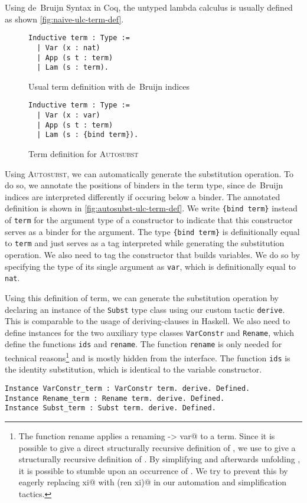 \documentclass{scrartcl}
\newcommand{\Autosubst}{\textsc{Autosubst}\xspace}
\newcommand{\lst}{\lstinline}
\begin{document}
Using de~Bruijn Syntax in Coq, the untyped lambda calculus is usually defined as shown \autoref{fig:naive-ulc-term-def}.
\begin{figure}
\begin{minipage}{0.45\textwidth}
  \centering
\begin{lstlisting}
Inductive term : Type :=
  | Var (x : nat)
  | App (s t : term)
  | Lam (s : term).
\end{lstlisting}
  \caption{Usual term definition with de~Bruijn indices}
  \label{fig:naive-ulc-term-def}
\end{minipage}
\hfill
\begin{minipage}{0.45\textwidth} 
  \begin{lstlisting}
Inductive term : Type :=
  | Var (x : var)
  | App (s t : term)
  | Lam (s : {bind term}). 
\end{lstlisting}
\caption{Term definition for \Autosubst}
\label{fig:autosubst-ulc-term-def}
\end{minipage}
\end{figure}
Using \Autosubst, we can automatically generate the substitution operation.
To do so, we annotate the positions of binders in the term type, since de~Bruijn indices are interpreted differently if occuring below a binder. The annotated definition is shown in \autoref{fig:autosubst-ulc-term-def}.
We write \lst${bind term}$ instead of \lst$term$ for the argument type of a constructor to indicate that this constructor serves as a binder for the argument. 
The type \lst${bind term}$ is definitionally equal to \lst$term$ and just serves as a tag interpreted while generating the substitution operation.
We also need to tag the constructor that builds variables. We do so by specifying the type of its single argument as \lst$var$, which is definitionally equal to \lst$nat$.

Using this definition of term, we can generate the substitution operation \lst@subst@ by declaring an instance of the \lst$Subst$ type class using our custom tactic \lst$derive$. This is comparable to the usage of deriving-clauses in Haskell.
We also need to define instances for the two auxiliary type classes \lst$VarConstr$ and \lst$Rename$, which define the functions \lst$ids$ and \lst$rename$. 
The function \lst$rename$ is only needed for technical reasons\footnote{The function rename applies a renaming \lst@var -> var@ to a term. Since it is possible to give a direct structurally recursive definition of \lst@rename@, we use \lst@rename@ to give a structurally recursive definition of \lst@subst@. By simplifying \lst@subst@ and afterwards unfolding \lst@up@, it is possible to stumble upon an occurrence of \lst@rename@. We try to prevent this by eagerly replacing \lst@rename xi@ with \lst@subst (ren xi)@ in our automation and simplification tactics.} and is mostly hidden from the interface.
The function \lst$ids$ is the identity substitution, which is identical to the variable constructor.
\begin{lstlisting}
Instance VarConstr_term : VarConstr term. derive. Defined.
Instance Rename_term : Rename term. derive. Defined.
Instance Subst_term : Subst term. derive. Defined.
\end{lstlisting}
\end{document}
